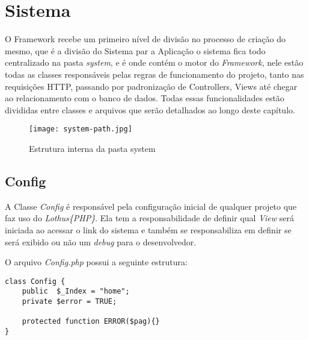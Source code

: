     \section{Sistema\label{sec:system-core}}

        O Framework recebe um primeiro nível de divisão no processo de criação do mesmo, que é a divisão do Sistema par a Aplicação o sistema fica todo centralizado na pasta \emph{system}, e é onde contém o motor do \emph{Framework}, nele estão todas as classes responsáveis pelas regras de funcionamento do projeto, tanto nas requisições HTTP, passando por padronização de Controllers, Views até chegar ao relacionamento com o banco de dados. Todas essas funcionalidades estão divididas entre classes e arquivos que serão detalhados ao longo deste capítulo.

    \begin{figure}[!htb]
        \centering
        \texttt{[image: system-path.jpg]}
        \caption{\small Estrutura interna da pasta system}
        \label{cap:sass}
    \end{figure}



        \subsection{Config\label{sub:system-config}}

            A Classe \emph{Config} é responsável pela configuração inicial de qualquer projeto que faz uso do \emph{Lothus\{PHP\}}. Ela tem a responsabilidade de definir qual \emph{View} será iniciada ao acessar o link do sistema e também se responsabiliza em definir se será exibido ou não um \emph{debug} para o desenvolvedor.

            \emph{}

            O arquivo \emph{Config.php} possui a seguinte estrutura:

            \emph{}

\begin{lstlisting}
class Config {
    public  $_Index = "home";
    private $error = TRUE;

    protected function ERROR($pag){}
}
\end{lstlisting}



